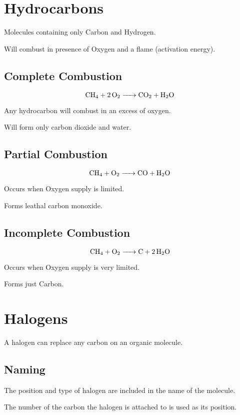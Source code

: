 \documentclass[a4paper,11pt]{article}
\begin{document}
\section{Hydrocarbons}

Molecules containing only Carbon and Hydrogen.

Will combust in presence of Oxygen and a flame (activation energy).


\subsection{Complete Combustion}

$$
\ce{CH4 + 2O2 -> CO2 + H2O}
$$

Any hydrocarbon will combust in an excess of oxygen.

Will form only carbon dioxide and water.


\subsection{Partial Combustion}

$$
\ce{CH4 + O2 -> CO + H2O}
$$

Occurs when Oxygen supply is limited.

Forms leathal carbon monoxide.


\subsection{Incomplete Combustion}

$$
\ce{CH4 + O2 -> C + 2H2O}
$$

Occurs when Oxygen supply is very limited.

Forms just Carbon.




\section{Halogens}

A halogen can replace any carbon on an organic molecule.


\subsection{Naming}

The position and type of halogen are included in the name of the molecule.

The number of the carbon the halogen is attached to is used as its position.
\end{document}
